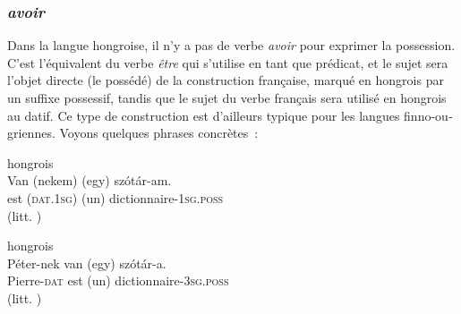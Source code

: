 \documentclass[output=paper,colorlinks,citecolor=brown,arabicfont,chinesefont,booklanguage=french]{langscibook}
\begin{document}
\begin{otherlanguage}{french}
\subsubsection{\textit{avoir}}

Dans la langue hongroise, il n’y a pas de verbe \emph{avoir} pour exprimer la possession. C’est l’équivalent du verbe \emph{être} qui s’utilise en tant que prédicat, et le sujet sera l’objet directe (le possédé) de la construction française, marqué en hongrois par un suffixe possessif, tandis que le sujet du verbe français sera utilisé en hongrois au datif. Ce type de construction est d’ailleurs typique pour les langues finno-ougriennes. Voyons quelques phrases concrètes~:

\ea hongrois\\
\gll Van (nekem) (egy) szótár-am.\\
     est (\textsc{dat.1sg}) (un) dictionnaire-\textsc{1sg.poss}\\
\glt {} (litt. )
        
\ex hongrois\\
\gll Péter-nek van (egy) szótár-a.\\
     Pierre-\textsc{dat} est (un) dictionnaire-\textsc{3sg.poss}\\
\glt {} (litt. )
\z


\end{otherlanguage}
\end{document}

